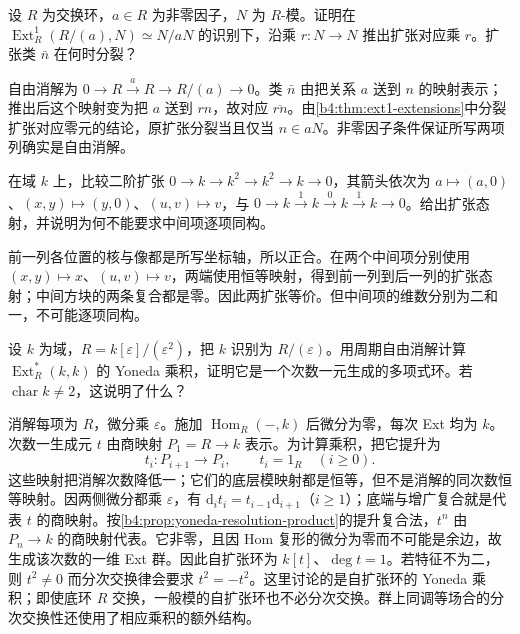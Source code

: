 \begin{exercise}\label{b4:ex:09-pushout-scalar}
	设 \(R\) 为交换环，\(a\in R\) 为非零因子，\(N\) 为 \(R\)-模。证明在 \(\operatorname{Ext}_R^1(R/(a),N)\simeq N/aN\) 的识别下，沿乘 \(r:N\to N\) 推出扩张对应乘 \(r\)。扩张类 \(\bar n\) 在何时分裂？
\end{exercise}
\begin{solution}
	自由消解为 \(0\to R\xrightarrow{a}R\to R/(a)\to0\)。类 \(\bar n\) 由把关系 \(a\) 送到 \(n\) 的映射表示；推出后这个映射变为把 \(a\) 送到 \(rn\)，故对应 \(\overline{rn}\)。由\cref{b4:thm:ext1-extensions}中分裂扩张对应零元的结论，原扩张分裂当且仅当 \(n\in aN\)。非零因子条件保证所写两项列确实是自由消解。
\end{solution}

\begin{exercise}\label{b4:ex:09-higher-not-isomorphism}
	在域 \(k\) 上，比较二阶扩张 \(0\to k\to k^2\to k^2\to k\to0\)，其箭头依次为 \(a\mapsto(a,0)\)、\((x,y)\mapsto(y,0)\)、\((u,v)\mapsto v\)，与 \(0\to k\xrightarrow{1}k\xrightarrow{0}k\xrightarrow{1}k\to0\)。给出扩张态射，并说明为何不能要求中间项逐项同构。
\end{exercise}
\begin{solution}
	前一列各位置的核与像都是所写坐标轴，所以正合。在两个中间项分别使用 \((x,y)\mapsto x\)、\((u,v)\mapsto v\)，两端使用恒等映射，得到前一列到后一列的扩张态射；中间方块的两条复合都是零。因此两扩张等价。但中间项的维数分别为二和一，不可能逐项同构。
\end{solution}

\begin{exercise}\label{b4:ex:09-dual-number-product}
	设 \(k\) 为域，\(R=k[\varepsilon]/(\varepsilon^2)\)，把 \(k\) 识别为 \(R/(\varepsilon)\)。用周期自由消解计算 \(\operatorname{Ext}_R^*(k,k)\) 的 Yoneda 乘积，证明它是一个次数一元生成的多项式环。若 \(\operatorname{char}k\ne2\)，这说明了什么？
\end{exercise}
\begin{solution}
	消解每项为 \(R\)，微分乘 \(\varepsilon\)。施加 \(\operatorname{Hom}_R(-,k)\) 后微分为零，每次 Ext 均为 \(k\)。次数一生成元 \(t\) 由商映射 \(P_1=R\to k\) 表示。为计算乘积，把它提升为
	\[
		t_i:P_{i+1}\longrightarrow P_i,\qquad t_i=1_R\quad(i\ge0).
	\]
	这些映射把消解次数降低一；它们的底层模映射都是恒等，但不是消解的同次数恒等映射。因两侧微分都乘 \(\varepsilon\)，有 \(\mathrm{d}_i t_i=t_{i-1}\mathrm{d}_{i+1}\)（\(i\ge1\)）；底端与增广复合就是代表 \(t\) 的商映射。按\cref{b4:prop:yoneda-resolution-product}的提升复合法，\(t^n\) 由 \(P_n\to k\) 的商映射代表。它非零，且因 Hom 复形的微分为零而不可能是余边，故生成该次数的一维 Ext 群。因此自扩张环为 \(k[t]\)、\(\deg t=1\)。若特征不为二，则 \(t^2\ne0\) 而分次交换律会要求 \(t^2=-t^2\)。这里讨论的是自扩张环的 Yoneda 乘积；即使底环 \(R\) 交换，一般模的自扩张环也不必分次交换。群上同调等场合的分次交换性还使用了相应乘积的额外结构。
\end{solution}

